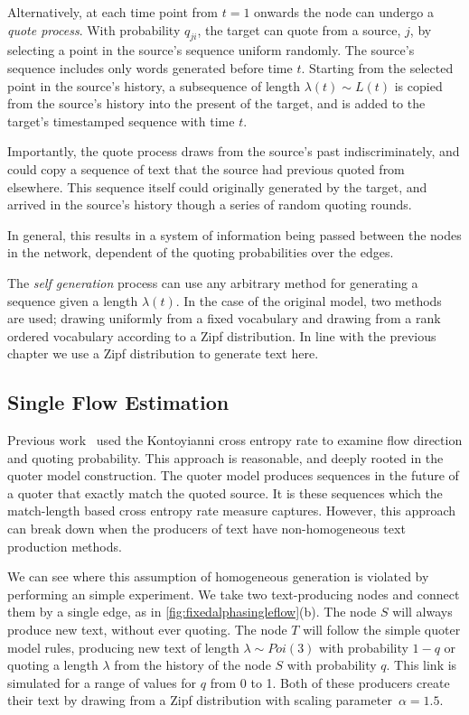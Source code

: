 Alternatively, at each time point from $t=1$ onwards the node can undergo a \emph{quote process}. With probability $q_{ji}$, the target can quote from a source, $j$, by selecting a point in the source's sequence uniform randomly. The source's sequence includes only words generated before time $t$. Starting from the selected point in the source's history, a subsequence of length $\lambda(t) \sim L(t)$ is copied from the source's history into the present of the target, and is added to the target's timestamped sequence with time $t$.

Importantly, the quote process draws from the source's past indiscriminately, and could copy a sequence of text that the source had previous quoted from elsewhere. This sequence itself could originally generated by the target, and arrived in the source's history though a series of random quoting rounds. 

In general, this results in a system of information being passed between the nodes in the network, dependent of the quoting probabilities over the edges.

The \emph{self generation} process can use any arbitrary method for generating a sequence given a length $\lambda(t)$. In the case of the original model, two methods are used; drawing uniformly from a fixed vocabulary and drawing from a rank ordered vocabulary according to a Zipf distribution. In line with the previous chapter we use a Zipf distribution to generate text here.


\subsection{Single Flow Estimation} 

Previous work~\cite{bagrow_quoter_2018} used the Kontoyianni cross entropy rate to examine flow direction and quoting probability. This approach is reasonable, and deeply rooted in the quoter model construction. The quoter model produces sequences in the future of a quoter that exactly match the quoted source. It is these sequences which the match-length based cross entropy rate measure captures. However, this approach can break down when the producers of text have non-homogeneous text production methods.

We can see where this assumption of homogeneous generation is violated by performing an simple experiment. We take two text-producing nodes and connect them by a single edge, as in \autoref{fig:fixedalphasingleflow}(b). The node $S$ will always produce new text, without ever quoting. The node $T$ will follow the simple quoter model rules, producing new text of length $\lambda \sim Poi(3)$ with probability $1-q$ or quoting a length $\lambda$ from the history of the node $S$ with probability $q$. This link is simulated for a range of values for $q$ from 0 to 1. Both of these producers create their text by drawing from a Zipf distribution with scaling parameter~$\alpha=1.5$.

